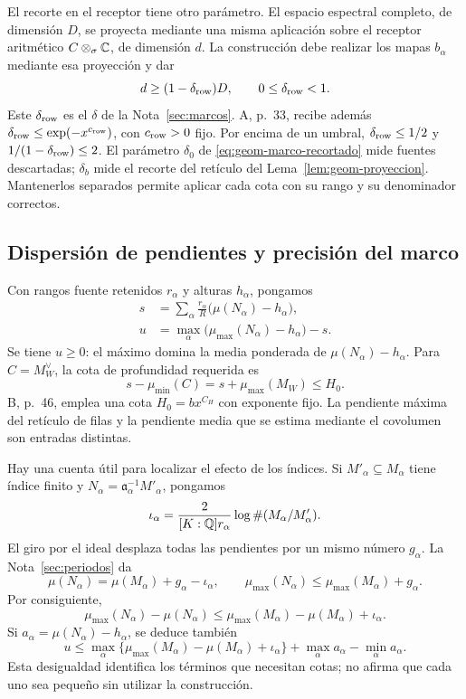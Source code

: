 El recorte en el receptor tiene otro parámetro.
El espacio espectral completo, de dimensión $D$, se proyecta
mediante una misma aplicación sobre el receptor aritmético
$C\otimes_\sigma\mathbb{C}$, de dimensión $d$.
La construcción debe realizar los mapas $b_\alpha$ mediante
esa proyección y dar
\begin{equation}
                      d\ge(1-\delta_{\rm row})D,
                 \qquad 0\le\delta_{\rm row}<1.
 \label{eq:geom-rango-receptor}
\end{equation}
Este $\delta_{\rm row}$ es el $\delta$ de la Nota~\ref{sec:marcos}.
A, p.~33, recibe además
$\delta_{\rm row}\le\exp(-x^{c_{\rm row}})$, con
$c_{\rm row}>0$ fijo. Por encima de un umbral,
$\delta_{\rm row}\le1/2$ y
$1/(1-\delta_{\rm row})\le2$.
El parámetro $\delta_0$ de \eqref{eq:geom-marco-recortado}
mide fuentes descartadas; $\delta_b$ mide el recorte del
retículo del Lema~\ref{lem:geom-proyeccion}.
Mantenerlos separados permite aplicar cada cota con su rango
y su denominador correctos.

\subsection{Dispersión de pendientes y precisión del marco}

Con rangos fuente retenidos $r_\alpha$ y alturas $h_\alpha$,
pongamos
\begin{align}
 s&=\sum_\alpha\frac{r_\alpha}{R}
                    \bigl(\mu(N_\alpha)-h_\alpha\bigr),
                    \label{eq:geom-media-ajustada}\\
 u&=\max_\alpha\bigl(\mu_{\max}(N_\alpha)-h_\alpha\bigr)-s.
                    \label{eq:geom-dispersion}
\end{align}
Se tiene $u\ge0$: el máximo domina la media ponderada de
$\mu(N_\alpha)-h_\alpha$.
Para $C=M_W^\vee$, la cota de profundidad requerida es
\[
 s-\mu_{\min}(C)=s+\mu_{\max}(M_W)\le H_0.
\]
B, p.~46, emplea una cota $H_0=bx^{C_H}$ con exponente fijo.
La pendiente máxima del retículo de filas y la pendiente media
que se estima mediante el covolumen son entradas distintas.

Hay una cuenta útil para localizar el efecto de los índices.
Si $M'_\alpha\subseteq M_\alpha$ tiene índice finito y
$N_\alpha=\mathfrak a_\alpha^{-1}M'_\alpha$, pongamos
\[
 \iota_\alpha=
 \frac{2}{[K:\mathbb{Q}]r_\alpha}\log\#(M_\alpha/M'_\alpha).
\]
El giro por el ideal desplaza todas las pendientes por un
mismo número $g_\alpha$. La Nota~\ref{sec:periodos} da
\[
 \mu(N_\alpha)=\mu(M_\alpha)+g_\alpha-\iota_\alpha,
 \qquad
 \mu_{\max}(N_\alpha)\le\mu_{\max}(M_\alpha)+g_\alpha.
\]
Por consiguiente,
\begin{equation}
 \mu_{\max}(N_\alpha)-\mu(N_\alpha)
 \le\mu_{\max}(M_\alpha)-\mu(M_\alpha)+\iota_\alpha.
 \label{eq:geom-dispersion-indice}
\end{equation}
Si $a_\alpha=\mu(N_\alpha)-h_\alpha$, se deduce también
\[
 u\le
 \max_\alpha\{\mu_{\max}(M_\alpha)-\mu(M_\alpha)+\iota_\alpha\}
       +\max_\alpha a_\alpha-\min_\alpha a_\alpha.
\]
Esta desigualdad identifica los términos que necesitan cotas;
no afirma que cada uno sea pequeño sin utilizar la construcción.

